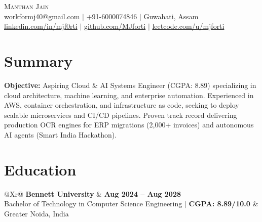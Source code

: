\documentclass[letterpaper,10pt]{article}
\begin{document}
\begin{center}
  {\Huge \scshape Manthan Jain} \\[6pt]
  \small 
  workformj40@gmail.com \hspace{8pt}$|$\hspace{8pt} +91-6000074846 \hspace{8pt}$|$\hspace{8pt} Guwahati, Assam \\[3pt]
  \href{https://www.linkedin.com/in/mjf0rti}{linkedin.com/in/mjf0rti} \hspace{8pt}$|$\hspace{8pt} \href{https://github.com/MJforti}{github.com/MJforti} \hspace{8pt}$|$\hspace{8pt} \href{https://leetcode.com/u/mjforti_/}{leetcode.com/u/mjforti}
\end{center}

\vspace{-8pt}
\section{Summary}
\small
\textbf{Objective:} Aspiring Cloud \& AI Systems Engineer (CGPA: 8.89) specializing in cloud architecture, machine learning, and enterprise automation. Experienced in AWS, container orchestration, and infrastructure as code, seeking to deploy scalable microservices and CI/CD pipelines. Proven track record delivering production OCR engines for ERP migrations (2,000+ invoices) and autonomous AI agents (Smart India Hackathon).

\vspace{-4pt}
\section{Education}
\small
\begin{tabularx}{\textwidth}{@{}Xr@{}}
  \textbf{Bennett University} & \textbf{Aug 2024 -- Aug 2028} \\
  Bachelor of Technology in Computer Science Engineering $|$ \textbf{CGPA: 8.89/10.0} & Greater Noida, India \\
\end{tabularx}

\vspace{-4pt}
\end{document}
